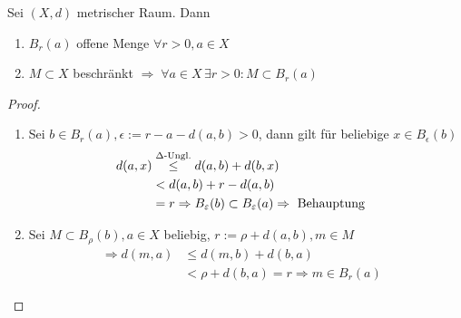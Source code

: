 \begin{lemma}
	Sei $(X,d)$ metrischer Raum. Dann
	\begin{enumerate}[label={\arabic*)}]
		\item $B_r(a)$ offene Menge $\forall r>0,a\in X$
		\item $M\subset X$ beschränkt $\Rightarrow\; \forall a\in X\,\exists r>0: M\subset B_r(a)$
	\end{enumerate}
\end{lemma}
\begin{proof}
	\begin{enumerate}[label={\arabic*)}]
		\item Sei $b \in B_r(a),\epsilon := r - a-d(a,b)>0$, dann gilt für beliebige $x \in B_{\epsilon}(b)$
		\begin{align*}
		d(a,x) &\overset{\Delta\text{-Ungl.}}{\leq} d(a,b) + d(b,x)\\
		&<d(a,b)+r-d(a,b)&\\
		&=r \Rightarrow B_{\varepsilon}(b) \subset B_{\varepsilon}(a) \Rightarrow \text{ Behauptung} &
		\end{align*}
		\item Sei $M\subset B_{\rho}(b),a\in X$ beliebig, $r:=\rho + d(a,b),m\in M$\\
		\begin{align*}
		\Rightarrow d(m,a) &\leq d(m,b)+d(b,a)&\\
		&<\rho + d(b,a) = r \Rightarrow m\in B_{r}(a)
		\end{align*}
	\end{enumerate}
\end{proof}

